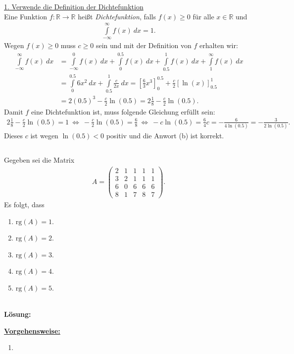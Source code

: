 \underline{1. Verwende die Definition der Dichtefunktion}\\
Eine Funktion $f : \mathbb{R} \to \mathbb{R}$ heißt \textit{Dichtefunktion}, falls $f(x) \geq 0$ für alle $x \in \mathbb{R}$ und
\begin{align*}
	\int \limits_{- \infty}^\infty f(x) \ dx = 1.
\end{align*}
Wegen $f(x) \geq 0 $ muss $c \geq 0 $ sein und mit der Definition von $f$ erhalten wir:
\begin{align*}
	\int \limits_{- \infty}^\infty f(x) \ dx
	&=
	\int \limits_{- \infty}^0 f(x) \ dx
	+
	\int \limits_{0}^{0.5} f(x) \ dx
	+
	\int \limits_{0.5}^{1} f(x) \ dx
	+
	\int \limits_{1}^{\infty} f(x) \ dx\\
	&=
	\int \limits_{0}^{0.5} 6x^2 \ dx
	+
	\int \limits_{0.5}^{1} \frac{c}{2x} \ dx
	=
	\left[\frac{6}{3} x^3 \right]_0^{0.5}
	+
	\frac{c}{2} \left[\ln(x)\right]_{0.5}^1\\
	&=
	2 (0.5)^3 - \frac{c}{2} \ln(0.5)	
	=
	2 \frac{1}{8} - \frac{c}{2} \ln(0.5).
\end{align*}
Damit $f$ eine Dichtefunktion ist, muss folgende Gleichung erfüllt sein:
\begin{align*}
	2 \frac{1}{8} - \frac{c}{2} \ln(0.5) = 1
	\ \Leftrightarrow \
	- \frac{c}{2} \ln(0.5) = \frac{6}{8}
	\ \Leftrightarrow \
	- c \ln(0.5) = \frac{6}{4}
	c = - \frac{6}{4 \ln(0.5)} = -\frac{3}{2 \ln(0.5)}.
\end{align*}
Dieses $c$ ist wegen $\ln(0.5 ) < 0 $ positiv und die Anwort (b) ist korrekt.

\newpage

\subsection*{}
Gegeben sei die Matrix
\begin{align*}
	A =
	\begin{pmatrix}
		2 & 1 & 1 & 1 & 1 \\
		3 & 2 & 1 & 1 & 1 \\
		6 & 0 & 6 & 6 & 6 \\ 
		8 & 1 & 7 & 8 & 7
	\end{pmatrix}.
\end{align*}
Es folgt, dass
\renewcommand{\labelenumi}{(\alph{enumi})}
\begin{enumerate}
	\item 
	$ \mathrm{rg}(A) = 1 $.
	\item 
	$ \mathrm{rg}(A) = 2 $.
	\item
	$ \mathrm{rg}(A) = 3 $.
	\item
	$ \mathrm{rg}(A) = 4 $.
	\item
	$ \mathrm{rg}(A) = 5 $.
\end{enumerate}
\ \\
\textbf{Lösung:}
\begin{mdframed}
\underline{\textbf{Vorgehensweise:}}
\renewcommand{\labelenumi}{\theenumi.}
\begin{enumerate}
\item 
\end{enumerate}
\end{mdframed}


